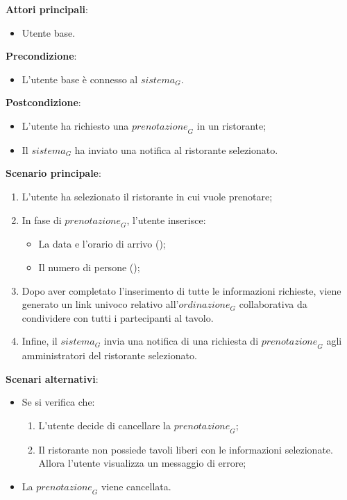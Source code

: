 \textbf{Attori principali}:
\begin{itemize}
    \item Utente base.
\end{itemize}
\textbf{Precondizione}:
\begin{itemize}
    \item L'utente base è connesso al $\textit{sistema}_G$.
\end{itemize}
\textbf{Postcondizione}:
\begin{itemize}
    \item L'utente ha richiesto una $\textit{prenotazione}_G$ in un ristorante;
    \item Il $\textit{sistema}_G$ ha inviato una notifica al ristorante selezionato.
\end{itemize}
\textbf{Scenario principale}:
\begin{enumerate}
    \item L'utente ha selezionato il ristorante in cui vuole prenotare;
    \item In fase di $\textit{prenotazione}_G$, l'utente inserisce:
    \begin{itemize}
        \item La data e l'orario di arrivo ();
        \item Il numero di persone ();
    \end{itemize}
    \item Dopo aver completato l'inserimento di tutte le informazioni richieste, viene generato un link univoco relativo all'$\textit{ordinazione}_G$ collaborativa da condividere con tutti i partecipanti al tavolo. 
    \item Infine, il $\textit{sistema}_G$ invia una notifica di una richiesta di $\textit{prenotazione}_G$ agli amministratori del ristorante selezionato.
\end{enumerate}
\textbf{Scenari alternativi}:
\begin{itemize}
    \item Se si verifica che:
    \begin{enumerate}
        \item L'utente decide di cancellare la $\textit{prenotazione}_G$;
        \item Il ristorante non possiede tavoli liberi con le informazioni selezionate. Allora l'utente visualizza un messaggio di errore;
    \end{enumerate}
    \item La $\textit{prenotazione}_G$ viene cancellata.
\end{itemize}



